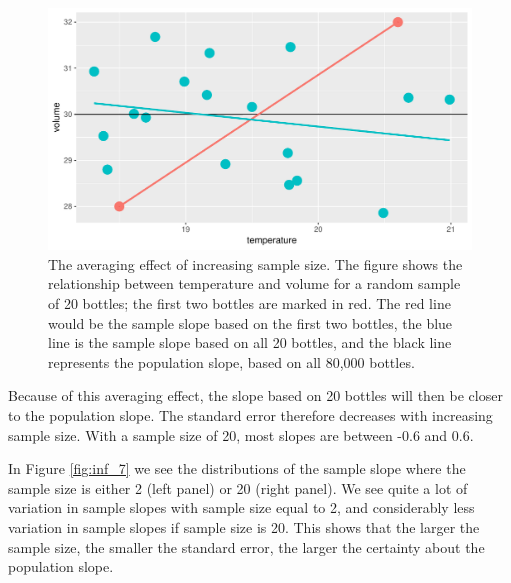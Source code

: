 \documentclass[]{book}\usepackage[]{graphicx}\usepackage[]{color}
\makeatletter
\def\maxwidth{ %
  \ifdim\Gin@nat@width>\linewidth
    \linewidth
  \else
    \Gin@nat@width
  \fi
}
\makeatother
\begin{document}
\begin{figure}

{\centering \includegraphics[width=\maxwidth]{figure/fig_samplesize20-1} 

}

\caption[The averaging effect of increasing sample size]{The averaging effect of increasing sample size. The figure shows the relationship between temperature and volume for a random sample of 20 bottles; the first two bottles are marked in red. The red line would be the sample slope based on the first two bottles, the blue line is the sample slope based on all 20 bottles, and the black line represents the population slope, based on all 80,000 bottles.}\label{fig:fig_samplesize20}
\end{figure}




Because of this averaging effect, the slope based on 20 bottles will then be closer to the population slope. The standard error therefore decreases with increasing sample size. With a sample size of 20, most slopes are between -0.6 and 0.6.

In Figure \ref{fig:inf_7} we see the distributions of the sample slope where the sample size is either 2 (left panel) or 20 (right panel). We see quite a lot of variation in sample slopes with sample size equal to 2, and considerably less variation in sample slopes if sample size is 20. This shows that the larger the sample size, the smaller the standard error, the larger the certainty about the population slope. 
\end{document}
